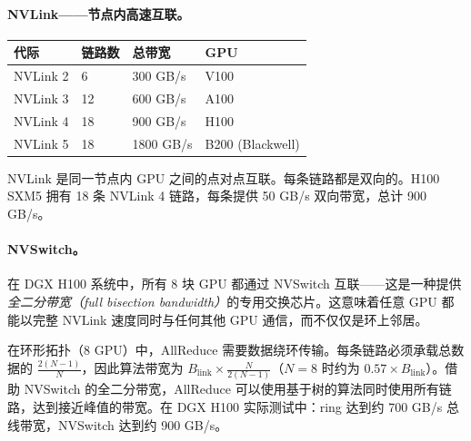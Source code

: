 \newpage
\paragraph{NVLink——节点内高速互联。}
\label{nvlink-intra-node-high-speed-interconnect.}
\nopagebreak
\begin{keybox}[NVLink 各代]
\begin{center}
\begin{tabular}{@{}l l l l@{}}
\toprule
\textbf{代际} & \textbf{链路数} & \textbf{总带宽} & \textbf{GPU} \\
\midrule
NVLink 2 & 6 & 300 GB/s & V100 \\
NVLink 3 & 12 & 600 GB/s & A100 \\
NVLink 4 & 18 & 900 GB/s & H100 \\
NVLink 5 & 18 & 1800 GB/s & B200 (Blackwell) \\
\bottomrule
\end{tabular}
\end{center}
\end{keybox}

NVLink 是同一节点内 GPU 之间的点对点互联。每条链路都是双向的。H100 SXM5 拥有 18 条 NVLink 4 链路，每条提供 50 GB/s 双向带宽，总计 900 GB/s。

\paragraph{NVSwitch。}
\label{nvswitch.}

在 DGX H100 系统中，所有 8 块 GPU 都通过 NVSwitch 互联——这是一种提供\emph{全二分带宽（full bisection bandwidth）}的专用交换芯片。这意味着任意 GPU 都能以完整 NVLink 速度同时与任何其他 GPU 通信，而不仅仅是环上邻居。

\begin{intuitionbox}[环形拓扑 vs. 全二分]
在环形拓扑（8 GPU）中，AllReduce 需要数据绕环传输。每条链路必须承载总数据的 $\frac{2(N-1)}{N}$，因此算法带宽为 $B_{\text{link}} \times \frac{N}{2(N-1)}$（$N=8$ 时约为 $0.57 \times B_{\text{link}}$）。借助 NVSwitch 的全二分带宽，AllReduce 可以使用基于树的算法同时使用所有链路，达到接近峰值的带宽。在 DGX H100 实际测试中：ring 达到约 700 GB/s 总线带宽，NVSwitch 达到约 900 GB/s。
\end{intuitionbox}

